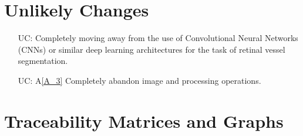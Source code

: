 \documentclass[12pt]{article}
\newcommand{\aref}[1]{A\ref{#1}}
\newcounter{ucnum} %
\begin{document}
\section{Unlikely Changes}    

\noindent 

\begin{itemize}

\item[UC\refstepcounter{ucnum}\theucnum\label{LC_2}:] Completely moving away from the use of Convolutional Neural Networks (CNNs) or similar deep learning architectures for the task of retinal vessel segmentation.

\item[UC\refstepcounter{ucnum}\theucnum\label{LC_3}:] \aref{A_3} Completely abandon image and processing operations.

\end{itemize}

\section{Traceability Matrices and Graphs}
\end{document}
